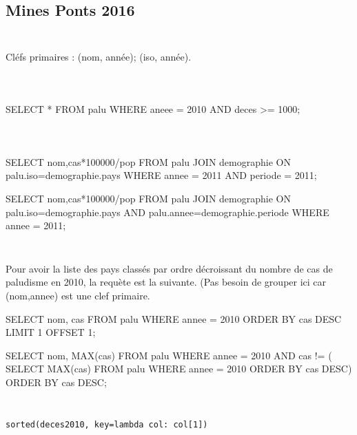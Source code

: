 \documentclass[10pt,fleqn]{article} %
\begin{document}

\vspace{2cm}
\pagestyle{fancy}
\thispagestyle{plain}

\begin{multicols}{2}
\subsection*{Mines Ponts 2016}

\subparagraph{}~\\
Cléfs primaires : (nom, année); (iso, année).

\subparagraph{}~\\
\begin{sql}
SELECT * FROM palu 
	WHERE aneee = 2010 AND deces >= 1000;
\end{sql}

\subparagraph{}~\\

\begin{sql}
SELECT nom,cas*100000/pop
	FROM palu
	JOIN demographie 
	ON palu.iso=demographie.pays
	WHERE annee = 2011 AND periode = 2011;

SELECT nom,cas*100000/pop
	FROM palu
	JOIN demographie 
	ON palu.iso=demographie.pays 
		AND palu.annee=demographie.periode
 	WHERE annee = 2011;
\end{sql}

\subparagraph{}~\\
Pour avoir la liste des pays classés par ordre décroissant du nombre de cas de paludisme en 2010, la requète est la suivante. (Pas besoin de grouper ici car (nom,annee) est une clef primaire. 
\begin{sql}
SELECT nom, cas
	FROM palu
	WHERE annee = 2010 
	ORDER BY cas DESC
	LIMIT 1 OFFSET 1; 
\end{sql}

\begin{sql}
SELECT nom, MAX(cas)
	FROM palu
	WHERE annee = 2010 AND cas != (
			SELECT MAX(cas)
			FROM palu
			WHERE annee = 2010
			ORDER BY cas DESC)
	ORDER BY cas DESC;
\end{sql}


\subparagraph{}~\\

\texttt{sorted(deces2010, key=lambda col: col[1])}

\end{multicols}
\end{document}

